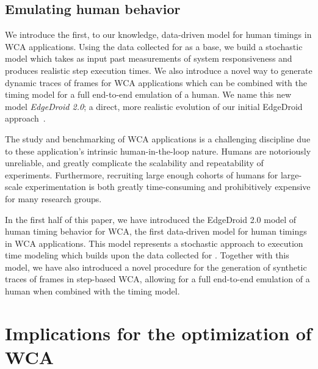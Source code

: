 \subsection{Emulating human behavior}

We introduce the first, to our knowledge, data-driven model for human timings in \ac{WCA} applications.
Using the data collected for \textcite{olguinmunoz:impact2021} as a base, we build a stochastic model which takes as input past measurements of system responsiveness and produces realistic step execution times.
We also introduce a novel way to generate dynamic traces of frames for \ac{WCA} applications which can be combined with the timing model for a full end-to-end emulation of a human.
We name this new model \emph{EdgeDroid 2.0}; a direct, more realistic evolution of our initial EdgeDroid approach~\cite{olguin2018scaling,olguin2019edgedroid}.

The study and benchmarking of \ac{WCA} applications is a challenging discipline due to these application's intrinsic human-in-the-loop nature.
Humans are notoriously unreliable, and greatly complicate the scalability and repeatability of experiments.
Furthermore, recruiting large enough cohorts of humans for large-scale experimentation is both greatly time-consuming and prohibitively expensive for many research groups.

In the first half of this paper, we have introduced the EdgeDroid 2.0 model of human timing behavior for \ac{WCA}, the first data-driven model for human timings in \ac{WCA} applications.
This model represents a stochastic approach to execution time modeling which builds upon the data collected for \textcite{olguinmunoz:impact2021}.
Together with this model, we have also introduced a novel procedure for the generation of synthetic traces of frames in step-based \ac{WCA}, allowing for a full end-to-end emulation of a human when combined with the timing model.


\section{Implications for the optimization of \ac{WCA}}

